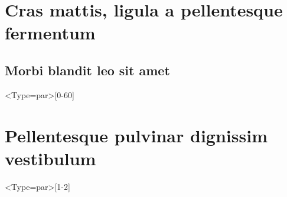 \documentclass[danish, coverstyle=graphic]{aau-report}
\begin{document}
\chapter{Cras mattis, ligula a pellentesque fermentum}

\section{Morbi blandit leo sit amet}

\ipsum<Type=par>[0-60]~\cite{madsen-2010}\par

\appendix

\chapter{Pellentesque pulvinar dignissim vestibulum}

\ipsum<Type=par>[1-2]
\end{document}
